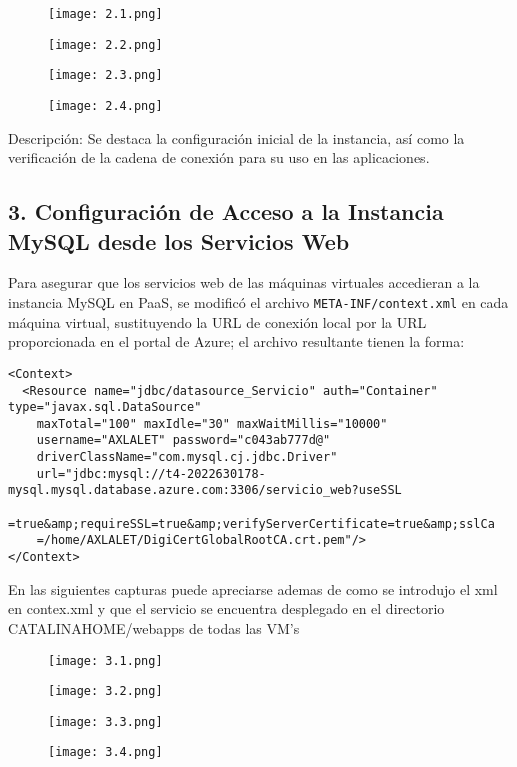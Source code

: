 \documentclass[12pt]{article}
\begin{document}
\begin{figure}[H]
    \centering
    \texttt{[image: 2.1.png]}
\end{figure}
\begin{figure}[H]
    \centering
    \texttt{[image: 2.2.png]}
\end{figure}
\begin{figure}[H]
    \centering
    \texttt{[image: 2.3.png]}
\end{figure}
\begin{figure}[H]
    \centering
    \texttt{[image: 2.4.png]}
\end{figure}

Descripción: Se destaca la configuración inicial de la instancia, así como la verificación de la cadena de conexión para su uso en las aplicaciones.

\subsection*{3. Configuración de Acceso a la Instancia MySQL desde los Servicios Web}
Para asegurar que los servicios web de las máquinas virtuales accedieran a la instancia MySQL en PaaS, se modificó el archivo \texttt{META-INF/context.xml} en cada máquina virtual, sustituyendo la URL de conexión local por la URL proporcionada en el portal de Azure; el archivo resultante tienen la forma: 

\begin{lstlisting}
<Context>
  <Resource name="jdbc/datasource_Servicio" auth="Container" type="javax.sql.DataSource"
    maxTotal="100" maxIdle="30" maxWaitMillis="10000"
    username="AXLALET" password="c043ab777d@"
    driverClassName="com.mysql.cj.jdbc.Driver"
    url="jdbc:mysql://t4-2022630178-mysql.mysql.database.azure.com:3306/servicio_web?useSSL
    =true&amp;requireSSL=true&amp;verifyServerCertificate=true&amp;sslCa
    =/home/AXLALET/DigiCertGlobalRootCA.crt.pem"/>
</Context>
\end{lstlisting}

En las siguientes capturas puede apreciarse ademas de como se introdujo el xml en contex.xml y que el servicio se encuentra desplegado en el directorio \textdollar CATALINA\textunderscore HOME/webapps de todas las VM's

\begin{figure}[H]
    \centering
    \texttt{[image: 3.1.png]}
\end{figure}
\begin{figure}[H]
    \centering
    \texttt{[image: 3.2.png]}
\end{figure}
\begin{figure}[H]
    \centering
    \texttt{[image: 3.3.png]}
\end{figure}
\begin{figure}[H]
    \centering
    \texttt{[image: 3.4.png]}
\end{figure}
\end{document}
